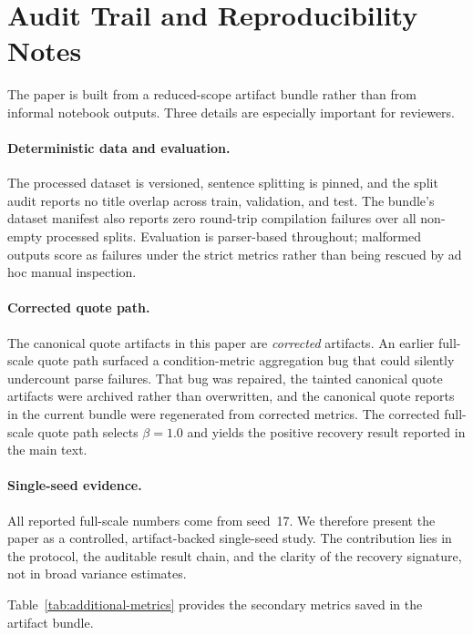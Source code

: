 
\section{Audit Trail and Reproducibility Notes}
\label{app:audit}

The paper is built from a reduced-scope artifact bundle rather than from informal notebook outputs. Three details are especially important for reviewers.

\paragraph{Deterministic data and evaluation.}
The processed dataset is versioned, sentence splitting is pinned, and the split audit reports no title overlap across train, validation, and test. The bundle's dataset manifest also reports zero round-trip compilation failures over all non-empty processed splits. Evaluation is parser-based throughout; malformed outputs score as failures under the strict metrics rather than being rescued by ad hoc manual inspection.

\paragraph{Corrected quote path.}
The canonical quote artifacts in this paper are \emph{corrected} artifacts. An earlier full-scale quote path surfaced a condition-metric aggregation bug that could silently undercount parse failures. That bug was repaired, the tainted canonical quote artifacts were archived rather than overwritten, and the canonical quote reports in the current bundle were regenerated from corrected metrics. The corrected full-scale quote path selects $\beta=1.0$ and yields the positive recovery result reported in the main text.

\paragraph{Single-seed evidence.}
All reported full-scale numbers come from seed~17. We therefore present the paper as a controlled, artifact-backed single-seed study. The contribution lies in the protocol, the auditable result chain, and the clarity of the recovery signature, not in broad variance estimates.

Table~\ref{tab:additional-metrics} provides the secondary metrics saved in the artifact bundle.

